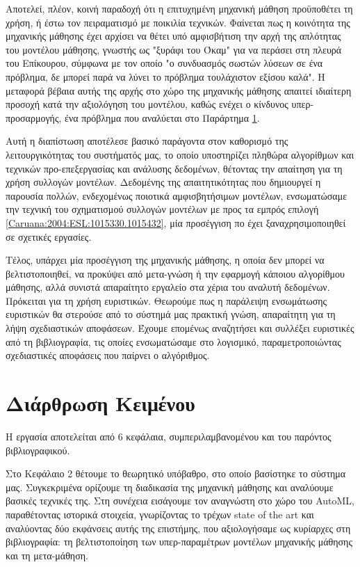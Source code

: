 Αποτελεί, πλέον, κοινή παραδοχή ότι η επιτυχημένη μηχανική μάθηση προϋποθέτει τη χρήση, ή έστω τον πειραματισμό με ποικιλία τεχνικών. Φαίνεται πως η κοινότητα της μηχανικής μάθησης έχει αρχίσει να θέτει υπό αμφισβήτιση την αρχή της απλότητας του μοντέλου μάθησης, γνωστής ως "ξυράφι του Όκαμ" για να περάσει στη πλευρά του Επίκουρου, σύμφωνα με τον οποίο "ο συνδυασμός σωστών λύσεων σε ένα πρόβλημα, δε μπορεί παρά να λύνει το πρόβλημα τουλάχιστον εξίσου καλά". Η μεταφορά βέβαια αυτής της αρχής στο χώρο της μηχανικής μάθησης απαιτεί ιδιαίτερη προσοχή κατά την αξιολόγηση του μοντέλου, καθώς ενέχει ο κίνδυνος υπερ-προσαρμογής, ένα πρόβλημα που αναλύεται στο Παράρτημα \ref{}.

Αυτή η διαπίστωση αποτέλεσε βασικό παράγοντα στον καθορισμό της λειτουργικότητας του συστήματός μας, το οποίο υποστηρίζει πληθώρα αλγορίθμων και τεχνικών προ-επεξεργασίας και ανάλυσης δεδομένων, θέτοντας την απαίτηση για τη χρήση συλλογών μοντέλων. Δεδομένης της απαιτητικότητας που δημιουργεί η παρουσία πολλών, ενδεχομένως ποιοτικά αμφισβητήσιμων μοντέλων, ενσωματώσαμε την τεχνική του σχηματισμού συλλογών μοντέλων με προς τα εμπρός επιλογή \ref{Caruana:2004:ESL:1015330.1015432}, μία προσέγγιση πο έχει ξαναχρησιμοποιηθεί σε σχετικές εργασίες.

Τέλος, υπάρχει μία προσέγγιση της μηχανικής μάθησης, η οποία δεν μπορεί να βελτιστοποιηθεί, να προκύψει από μετα-γνώση ή την εφαρμογή κάποιου αλγορίθμου μάθησης, αλλά συνιστά απαραίτητο εργαλείο στα χέρια του αναλυτή δεδομένων. Πρόκειται για τη χρήση ευριστικών. Θεωρούμε πως η παράλειψη ενσωμάτωσης ευριστικών θα στερούσε από το σύστημά μας πρακτική γνώση, απαραίτητη για τη λήψη σχεδιαστικών αποφάσεων. Έχουμε επομένως αναζητήσει και συλλέξει ευριστικές από τη βιβλιογραφία, τις οποίες ενσωματώσαμε στο λογισμικό, παραμετροποιώντας σχεδιαστικές αποφάσεις που παίρνει ο αλγόριθμος.

\section{Διάρθρωση Κειμένου} Η εργασία αποτελείται από 6 κεφάλαια, συμπεριλαμβανομένου και του παρόντος βιβλιογραφικού.

Στο Κεφάλαιο 2 θέτουμε το θεωρητικό υπόβαθρο, στο οποίο βασίστηκε το σύστημα μας. Συγκεκριμένα ορίζουμε τη διαδικασία της μηχανική μάθησης και αναλύουμε βασικές τεχνικές της. Στη συνέχεια εισάγουμε τον αναγνώστη στο χώρο του AutoML, παραθέτοντας ιστορικά στοιχεία, γνωρίζοντας το τρέχων state of the art και αναλύοντας δύο εκφάνσεις αυτής της επιστήμης, που αξιολογήσαμε ως κυρίαρχες στη βιβλιογραφία: τη βελτιστοποίηση των υπερ-παραμέτρων μοντέλων μηχανικής μάθησης και τη μετα-μάθηση.  

